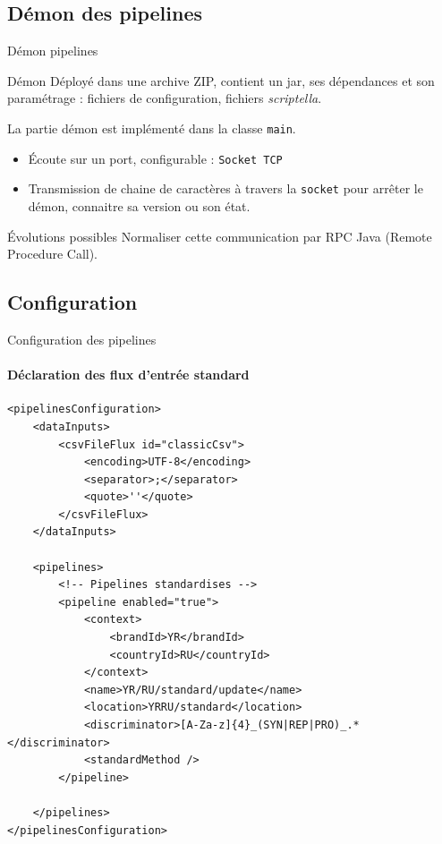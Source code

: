 \documentclass[compact]{beamer}%
\begin{document}
\subsection{Démon des pipelines}

\begin{frame}{Démon pipelines}

	\begin{block}{Démon}
	Déployé dans une archive ZIP, contient un jar, ses dépendances et son paramétrage : fichiers de configuration, fichiers \emph{scriptella}.\par
	La partie démon est implémenté dans la classe \texttt{main}.
	\end{block}

	\pause
	\begin{itemize}
	\item Écoute sur un port, configurable : \texttt{Socket TCP}
	\item Transmission de chaine de caractères à travers la \texttt{socket} pour arrêter le démon, connaitre sa version ou son état.
	\end{itemize}

	\pause
	\begin{exampleblock}{Évolutions possibles}
	Normaliser cette communication par RPC Java (Remote Procedure Call).
	\end{exampleblock}

\end{frame}

\subsection{Configuration}

\begin{frame}[containsverbatim]{Configuration des pipelines}
	\framesubtitle{Déclaration des flux d'entrée standard}
	
	\lstset{language=XML}
	\begin{lstlisting}
<pipelinesConfiguration>
	<dataInputs>
		<csvFileFlux id="classicCsv">
			<encoding>UTF-8</encoding>
			<separator>;</separator>
			<quote>''</quote>
		</csvFileFlux>
	</dataInputs>
	
	<pipelines>
		<!-- Pipelines standardises -->
		<pipeline enabled="true">
			<context>
				<brandId>YR</brandId>
				<countryId>RU</countryId>
			</context>
			<name>YR/RU/standard/update</name>
			<location>YRRU/standard</location>
			<discriminator>[A-Za-z]{4}_(SYN|REP|PRO)_.*</discriminator>
			<standardMethod />
		</pipeline>
		
	</pipelines>
</pipelinesConfiguration>
	\end{lstlisting}

\end{frame}
\end{document}
